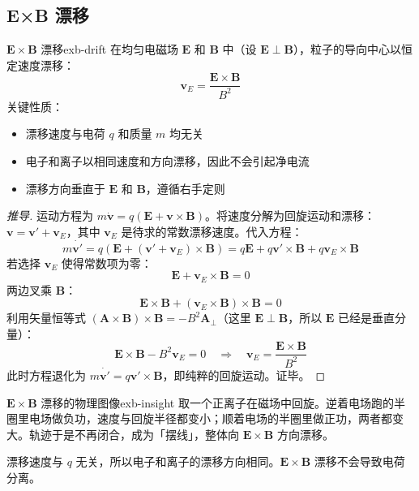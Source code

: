 \documentclass[12pt,a4paper,openany,oneside]{book}
\newcommand{\vect}[1]{\bm{#1}}
\begin{document}
\subsection{E×B 漂移}\label{sec:exb-drift}

\begin{theorem}{$\vect{E}\times\vect{B}$ 漂移}{exb-drift}
在均匀电磁场 $\vect{E}$ 和 $\vect{B}$ 中（设 $\vect{E}\perp\vect{B}$），粒子的导向中心以恒定速度漂移：
\[
\vect{v}_E = \frac{\vect{E}\times\vect{B}}{B^2}
\]
关键性质：
\begin{itemize}
\item 漂移速度与电荷 $q$ 和质量 $m$ 均无关
\item 电子和离子以相同速度和方向漂移，因此不会引起净电流
\item 漂移方向垂直于 $\vect{E}$ 和 $\vect{B}$，遵循右手定则
\end{itemize}
\end{theorem}

\begin{proof}[推导]
运动方程为 $m\dot{\vect{v}} = q(\vect{E} + \vect{v}\times\vect{B})$。将速度分解为回旋运动和漂移：$\vect{v} = \vect{v}' + \vect{v}_E$，其中 $\vect{v}_E$ 是待求的常数漂移速度。代入方程：
\[
m\dot{\vect{v}'} = q(\vect{E} + (\vect{v}' + \vect{v}_E)\times\vect{B}) = q\vect{E} + q\vect{v}'\times\vect{B} + q\vect{v}_E\times\vect{B}
\]
若选择 $\vect{v}_E$ 使得常数项为零：
\[
\vect{E} + \vect{v}_E\times\vect{B} = 0
\]
两边叉乘 $\vect{B}$：
\[
\vect{E}\times\vect{B} + (\vect{v}_E\times\vect{B})\times\vect{B} = 0
\]
利用矢量恒等式 $(\vect{A}\times\vect{B})\times\vect{B} = -B^2\vect{A}_\perp$（这里 $\vect{E}\perp\vect{B}$，所以 $\vect{E}$ 已经是垂直分量）：
\[
\vect{E}\times\vect{B} - B^2\vect{v}_E = 0 \quad\Rightarrow\quad \vect{v}_E = \frac{\vect{E}\times\vect{B}}{B^2}
\]
此时方程退化为 $m\dot{\vect{v}'} = q\vect{v}'\times\vect{B}$，即纯粹的回旋运动。证毕。
\end{proof}

\begin{insight}{$\vect{E}\times\vect{B}$ 漂移的物理图像}{exb-insight}
取一个正离子在磁场中回旋。逆着电场跑的半圈里电场做负功，速度与回旋半径都变小；顺着电场的半圈里做正功，两者都变大。轨迹于是不再闭合，成为「摆线」，整体向 $\vect{E}\times\vect{B}$ 方向漂移。

漂移速度与 $q$ 无关，所以电子和离子的漂移方向相同。$\vect{E}\times\vect{B}$ 漂移不会导致电荷分离。
\end{insight}
\end{document}
